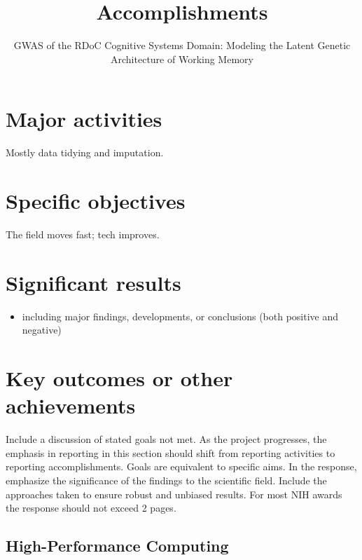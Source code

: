 \documentclass[%
numbers=noendperiod,
parskip=half,
bibliography=totoc,
,
]{scrartcl}
\title{Accomplishments}
\subtitle{GWAS of the RDoC Cognitive Systems Domain: Modeling the Latent Genetic Architecture of Working Memory}
\providecommand{\tightlist}{%
  \setlength{\itemsep}{0pt}\setlength{\parskip}{0pt}}
\begin{document}
\maketitle






\hypertarget{major-activities}{%
\section{Major activities}\label{major-activities}}

Mostly data tidying and imputation.

\hypertarget{specific-objectives}{%
\section{Specific objectives}\label{specific-objectives}}

The field moves fast; tech improves.

\hypertarget{significant-results}{%
\section{Significant results}\label{significant-results}}

\begin{itemize}
\tightlist
\item
  including major findings, developments, or conclusions (both positive and
  negative)
\end{itemize}

\hypertarget{key-outcomes-or-other-achievements}{%
\section{Key outcomes or other achievements}\label{key-outcomes-or-other-achievements}}

Include a discussion of stated goals not met. As the project progresses, the
emphasis in reporting in this section should shift from reporting activities to
reporting accomplishments. Goals are equivalent to specific aims. In the
response, emphasize the significance of the findings to the scientific field.
Include the approaches taken to ensure robust and unbiased results. For most NIH
awards the response should not exceed 2 pages.

\hypertarget{high-performance-computing}{%
\subsection{High-Performance Computing}\label{high-performance-computing}}
\end{document}
